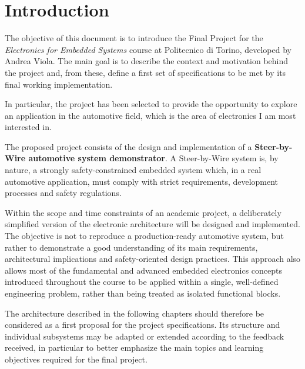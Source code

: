 \chapter{Introduction}

The objective of this document is to introduce the Final Project for the \textit{Electronics for Embedded Systems} course at Politecnico di Torino, developed by Andrea Viola. The main goal is to describe the context and motivation behind the project and, from these, define a first set of specifications to be met by its final working implementation.

In particular, the project has been selected to provide the opportunity to explore an application in the automotive field, which is the area of electronics I am most interested in.

The proposed project consists of the design and implementation of a \textbf{Steer-by-Wire automotive system demonstrator}. A Steer-by-Wire system is, by nature, a strongly safety-constrained embedded system which, in a real automotive application, must comply with strict requirements, development processes and safety regulations.

Within the scope and time constraints of an academic project, a deliberately simplified version of the electronic architecture will be designed and implemented. The objective is not to reproduce a production-ready automotive system, but rather to demonstrate a good understanding of its main requirements, architectural implications and safety-oriented design practices. This approach also allows most of the fundamental and advanced embedded electronics concepts introduced throughout the course to be applied within a single, well-defined engineering problem, rather than being treated as isolated functional blocks.

The architecture described in the following chapters should therefore be considered as a first proposal for the project specifications. Its structure and individual subsystems may be adapted or extended according to the feedback received, in particular to better emphasize the main topics and learning objectives required for the final project.